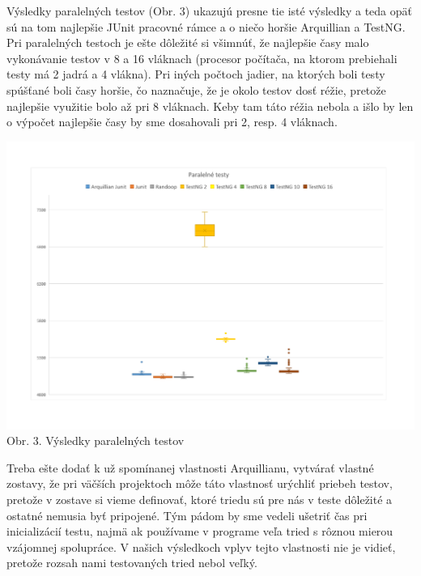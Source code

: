 \documentclass[11pt,twoside,slovak,a4paper]{article}
\begin{document}
	Výsledky paralelných testov (Obr. 3) ukazujú presne tie isté výsledky a teda opäť sú na tom najlepšie JUnit pracovné rámce a o niečo horšie Arquillian a TestNG. Pri paralelných testoch je ešte dôležité si všimnúť, že najlepšie časy malo vykonávanie testov v 8 a 16 vláknach (procesor počítača, na ktorom prebiehali testy má 2 jadrá a 4 vlákna). Pri iných počtoch jadier, na ktorých boli testy spúšťané boli časy horšie, čo naznačuje, že je 
	okolo testov dosť réžie, pretože najlepšie využitie bolo až pri 8 vláknach. Keby tam táto réžia nebola a išlo by len o výpočet najlepšie časy by sme dosahovali pri 2, resp. 4 vláknach.
	\begin{center}
		\hspace*{-1.8cm} 
		\includegraphics[width = 500pt, trim = 0pt 50pt 0pt 50pt]{graf_paralelne}
		\newline
		\tiny Obr. 3. Výsledky paralelných testov
	\end{center}
	
	Treba ešte dodať k už spomínanej vlastnosti Arquillianu, vytvárať vlastné zostavy, že pri väčších projektoch môže táto vlastnosť urýchliť priebeh testov, pretože v zostave si vieme definovať, ktoré triedu sú pre nás v teste dôležité a ostatné nemusia byť pripojené. Tým pádom by sme vedeli ušetriť čas pri inicializácií testu, najmä ak používame v programe veľa tried s rôznou mierou vzájomnej spolupráce. V našich výsledkoch vplyv tejto vlastnosti nie je vidieť, pretože rozsah nami testovaných tried nebol veľký.
	
\end{document}
